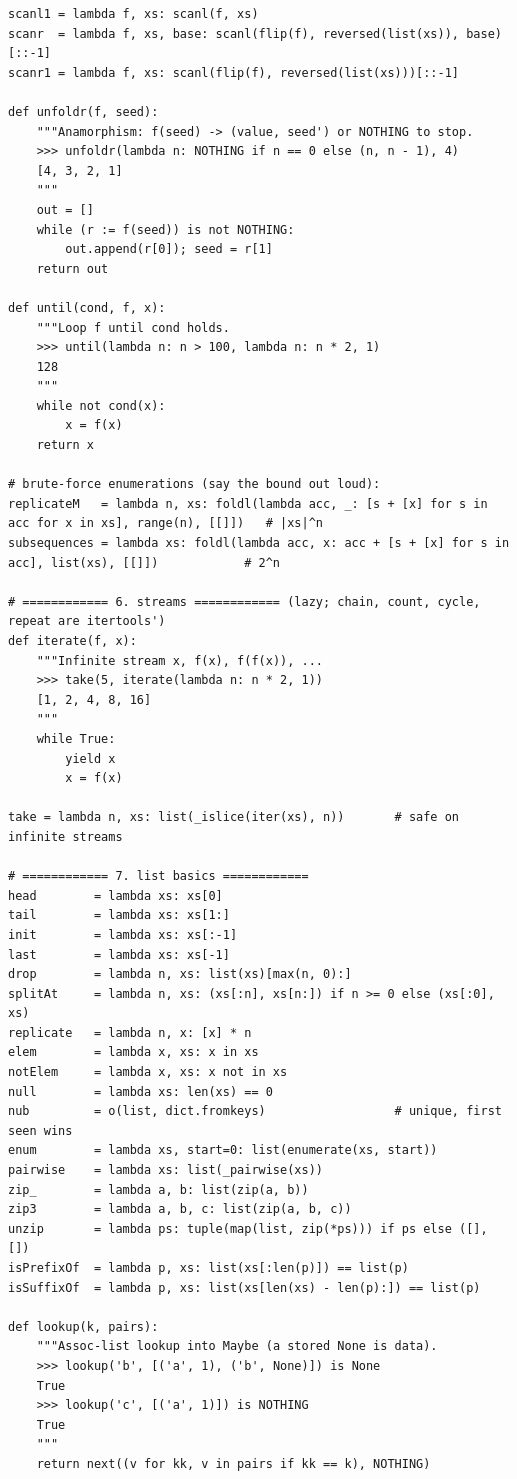 \documentclass[10pt,letterpaper]{book}
\begin{document}
\begin{lstlisting}[style=file]
scanl1 = lambda f, xs: scanl(f, xs)
scanr  = lambda f, xs, base: scanl(flip(f), reversed(list(xs)), base)[::-1]
scanr1 = lambda f, xs: scanl(flip(f), reversed(list(xs)))[::-1]

def unfoldr(f, seed):
    """Anamorphism: f(seed) -> (value, seed') or NOTHING to stop.
    >>> unfoldr(lambda n: NOTHING if n == 0 else (n, n - 1), 4)
    [4, 3, 2, 1]
    """
    out = []
    while (r := f(seed)) is not NOTHING:
        out.append(r[0]); seed = r[1]
    return out

def until(cond, f, x):
    """Loop f until cond holds.
    >>> until(lambda n: n > 100, lambda n: n * 2, 1)
    128
    """
    while not cond(x):
        x = f(x)
    return x

# brute-force enumerations (say the bound out loud):
replicateM   = lambda n, xs: foldl(lambda acc, _: [s + [x] for s in acc for x in xs], range(n), [[]])   # |xs|^n
subsequences = lambda xs: foldl(lambda acc, x: acc + [s + [x] for s in acc], list(xs), [[]])            # 2^n

# ============ 6. streams ============ (lazy; chain, count, cycle, repeat are itertools')
def iterate(f, x):
    """Infinite stream x, f(x), f(f(x)), ...
    >>> take(5, iterate(lambda n: n * 2, 1))
    [1, 2, 4, 8, 16]
    """
    while True:
        yield x
        x = f(x)

take = lambda n, xs: list(_islice(iter(xs), n))       # safe on infinite streams

# ============ 7. list basics ============
head        = lambda xs: xs[0]
tail        = lambda xs: xs[1:]
init        = lambda xs: xs[:-1]
last        = lambda xs: xs[-1]
drop        = lambda n, xs: list(xs)[max(n, 0):]
splitAt     = lambda n, xs: (xs[:n], xs[n:]) if n >= 0 else (xs[:0], xs)
replicate   = lambda n, x: [x] * n
elem        = lambda x, xs: x in xs
notElem     = lambda x, xs: x not in xs
null        = lambda xs: len(xs) == 0
nub         = o(list, dict.fromkeys)                  # unique, first seen wins
enum        = lambda xs, start=0: list(enumerate(xs, start))
pairwise    = lambda xs: list(_pairwise(xs))
zip_        = lambda a, b: list(zip(a, b))
zip3        = lambda a, b, c: list(zip(a, b, c))
unzip       = lambda ps: tuple(map(list, zip(*ps))) if ps else ([], [])
isPrefixOf  = lambda p, xs: list(xs[:len(p)]) == list(p)
isSuffixOf  = lambda p, xs: list(xs[len(xs) - len(p):]) == list(p)

def lookup(k, pairs):
    """Assoc-list lookup into Maybe (a stored None is data).
    >>> lookup('b', [('a', 1), ('b', None)]) is None
    True
    >>> lookup('c', [('a', 1)]) is NOTHING
    True
    """
    return next((v for kk, v in pairs if kk == k), NOTHING)


\end{lstlisting}
\end{document}
